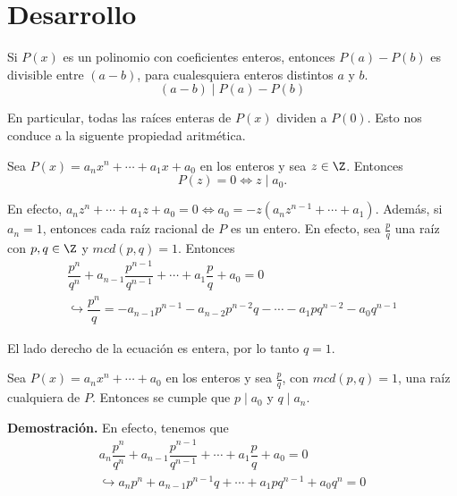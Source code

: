\section{Desarrollo}

\begin{theorem}
    Si $P(x)$ es un polinomio con coeficientes enteros, entonces $P(a) - P(b)$ es divisible entre $(a - b)$, para cualesquiera enteros distintos $a$ y $b$.
    \[(a - b) \mid P(a) - P(b)\]
\end{theorem}

En particular, todas las raíces enteras de $P(x)$ dividen a $P(0)$.
Esto nos conduce a la siguente propiedad aritmética.

\begin{section-definition}
    Sea $P(x) = a_n x^n + \cdots + a_1 x + a_0$ en los enteros y sea $z \in \Z$.
    Entonces \[P(z) = 0 \Leftrightarrow z \mid a_0.\]
\end{section-definition}

En efecto, $a_n z^n + \cdots + a_1 z + a_0 = 0 \Leftrightarrow a_0 = -z(a_n z^{n - 1} + \cdots + a_1)$.
Además, si $a_n = 1$, entonces cada raíz racional de $P$ es un entero. En efecto, sea $\frac{p}{q}$ una raíz con $p, q \in \Z$ y $mcd(p, q) = 1$.
Entonces
\begin{gather*}
    \dfrac{p^n}{q^n} + a_{n - 1} \dfrac{p^{n - 1}}{q^{n - 1}} + \cdots + a_1 \dfrac{p}{q} + a_0  = 0 \\
    \hookrightarrow \dfrac{p^n}{q} = - a_{n - 1} p^{n - 1} - a_{n - 2} p^{n - 2} q - \cdots - a_1 p q^{n - 2} - a_0 q^{n - 1}
\end{gather*}

El lado derecho de la ecuación es entera, por lo tanto $q = 1$.

\begin{theorem}
    Sea $P(x) = a_n x^n + \cdots + a_0$ en los enteros y sea $\frac{p}{q}$, con $mcd(p, q) = 1$, una raíz cualquiera de $P$.
    Entonces se cumple que $p \mid a_0$ y $q \mid a_n$.
\end{theorem}

\textbf{Demostración.} En efecto, tenemos que
\begin{gather*}
    a_n \dfrac{p^n}{q^n} + a_{n - 1} \dfrac{p^{n - 1}}{q^{n - 1}} + \cdots + a_1 \dfrac{p}{q} + a_0  = 0 \\
    \hookrightarrow a_n p^n + a_{n - 1}p^{n - 1}q + \cdots + a_1 p q^{n - 1} + a_0 q^n = 0
\end{gather*}

